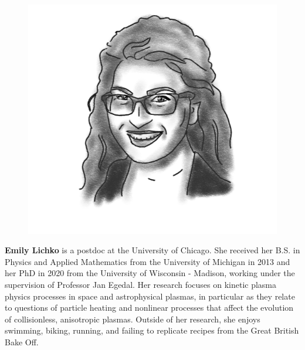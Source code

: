 \begin{figure}
\vspace{20pt}
\includegraphics[width=0.9\linewidth]{portraits/emily_l.png}
\end{figure}
\textbf{Emily Lichko} is a postdoc at the University of Chicago. She received her B.S. in Physics and Applied Mathematics from the University of Michigan in 2013 and her PhD in 2020 from the University of Wisconsin - Madison, working under the supervision of Professor Jan Egedal. Her research focuses on kinetic plasma physics processes in space and astrophysical plasmas, in particular as they relate to questions of particle heating and nonlinear processes that affect the evolution of collisionless, anisotropic plasmas. Outside of her research, she enjoys swimming, biking, running, and failing to replicate recipes from the Great British Bake Off. \\
\\

\vspace{-20pt}

